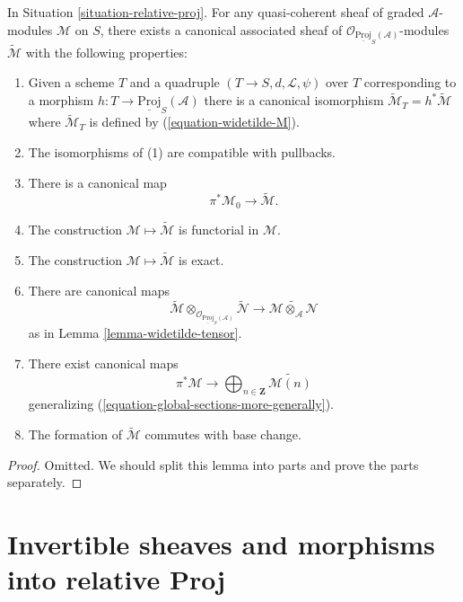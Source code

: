 \begin{lemma}
\label{lemma-relative-proj-modules}
In Situation \ref{situation-relative-proj}.
For any quasi-coherent sheaf of graded $\mathcal{A}$-modules
$\mathcal{M}$ on $S$, there exists a canonical associated sheaf
of $\mathcal{O}_{\underline{\text{Proj}}_S(\mathcal{A})}$-modules
$\widetilde{\mathcal{M}}$ with the following properties:
\begin{enumerate}
\item Given a scheme $T$ and a quadruple
$(T \to S, d, \mathcal{L}, \psi)$ over $T$
corresponding to a morphism
$h : T \to \underline{\text{Proj}}_S(\mathcal{A})$ there is
a canonical isomorphism
$\widetilde{\mathcal{M}}_T = h^*\widetilde{\mathcal{M}}$
where $\widetilde{\mathcal{M}}_T$ is defined by (\ref{equation-widetilde-M}).
\item The isomorphisms of (1) are compatible with pullbacks.
\item There is a canonical map
$$
\pi^*\mathcal{M}_0 \longrightarrow \widetilde{\mathcal{M}}.
$$
\item The construction $\mathcal{M} \mapsto \widetilde{\mathcal{M}}$
is functorial in $\mathcal{M}$.
\item The construction $\mathcal{M} \mapsto \widetilde{\mathcal{M}}$
is exact.
\item There are canonical maps
$$
\widetilde{\mathcal{M}}
\otimes_{\mathcal{O}_{\underline{\text{Proj}}_S(\mathcal{A})}}
\widetilde{\mathcal{N}}
\longrightarrow
\widetilde{\mathcal{M} \otimes_\mathcal{A} \mathcal{N}}
$$
as in
Lemma \ref{lemma-widetilde-tensor}.
\item There exist canonical maps
$$
\pi^*\mathcal{M}
\longrightarrow
\bigoplus\nolimits_{n \in \mathbf{Z}}
\widetilde{\mathcal{M}(n)}
$$
generalizing (\ref{equation-global-sections-more-generally}).
\item The formation of $\widetilde{\mathcal{M}}$ commutes with base change.
\end{enumerate}
\end{lemma}

\begin{proof}
Omitted. We should split this lemma into parts and prove the parts separately.
\end{proof}













\section{Invertible sheaves and morphisms into relative Proj}
\label{section-invertible-relative-proj}

